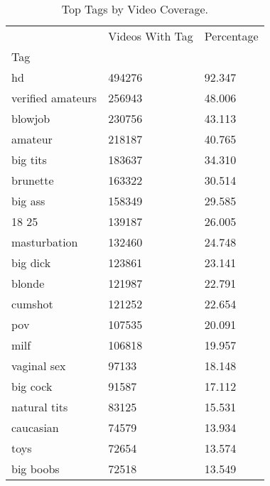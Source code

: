 \begin{table}[htbp]
\centering
\caption{Top Tags by Video Coverage.}
\label{tab:eda_top_tags}
\begin{tabular}{lll}
\toprule
 & Videos With Tag & Percentage \\
Tag &  &  \\
\midrule
hd & 494276 & 92.347 \\
verified amateurs & 256943 & 48.006 \\
blowjob & 230756 & 43.113 \\
amateur & 218187 & 40.765 \\
big tits & 183637 & 34.310 \\
brunette & 163322 & 30.514 \\
big ass & 158349 & 29.585 \\
18 25 & 139187 & 26.005 \\
masturbation & 132460 & 24.748 \\
big dick & 123861 & 23.141 \\
blonde & 121987 & 22.791 \\
cumshot & 121252 & 22.654 \\
pov & 107535 & 20.091 \\
milf & 106818 & 19.957 \\
vaginal sex & 97133 & 18.148 \\
big cock & 91587 & 17.112 \\
natural tits & 83125 & 15.531 \\
caucasian & 74579 & 13.934 \\
toys & 72654 & 13.574 \\
big boobs & 72518 & 13.549 \\
\bottomrule
\end{tabular}

\end{table}